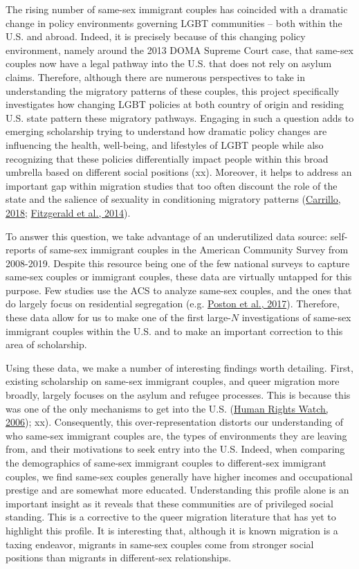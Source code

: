 \documentclass[
  11pt,
]{article}
\begin{document}
The rising number of same-sex immigrant couples has coincided with a dramatic change in policy environments governing LGBT communities -- both within the U.S. and abroad. Indeed, it is precisely because of this changing policy environment, namely around the 2013 DOMA Supreme Court case, that same-sex couples now have a legal pathway into the U.S. that does not rely on asylum claims. Therefore, although there are numerous perspectives to take in understanding the migratory patterns of these couples, this project specifically investigates how changing LGBT policies at both country of origin and residing U.S. state pattern these migratory pathways. Engaging in such a question adds to emerging scholarship trying to understand how dramatic policy changes are influencing the health, well-being, and lifestyles of LGBT people while also recognizing that these policies differentially impact people within this broad umbrella based on different social positions (xx). Moreover, it helps to address an important gap within migration studies that too often discount the role of the state and the salience of sexuality in conditioning migratory patterns (\protect\hyperlink{ref-carrillo_2018}{Carrillo, 2018}; \protect\hyperlink{ref-fitzgerald_2014}{Fitzgerald et al., 2014}).

To answer this question, we take advantage of an underutilized data source: self-reports of same-sex immigrant couples in the American Community Survey from 2008-2019. Despite this resource being one of the few national surveys to capture same-sex couples or immigrant couples, these data are virtually untapped for this purpose. Few studies use the ACS to analyze same-sex couples, and the ones that do largely focus on residential segregation (e.g. \protect\hyperlink{ref-poston_2017}{Poston et al., 2017}). Therefore, these data allow for us to make one of the first large-\(N\) investigations of same-sex immigrant couples within the U.S. and to make an important correction to this area of scholarship.

Using these data, we make a number of interesting findings worth detailing. First, existing scholarship on same-sex immigrant couples, and queer migration more broadly, largely focuses on the asylum and refugee processes. This is because this was one of the only mechanisms to get into the U.S. (\protect\hyperlink{ref-humanrightswatch_2006}{Human Rights Watch, 2006}); xx). Consequently, this over-representation distorts our understanding of who same-sex immigrant couples are, the types of environments they are leaving from, and their motivations to seek entry into the U.S. Indeed, when comparing the demographics of same-sex immigrant couples to different-sex immigrant couples, we find same-sex couples generally have higher incomes and occupational prestige and are somewhat more educated. Understanding this profile alone is an important insight as it reveals that these communities are of privileged social standing. This is a corrective to the queer migration literature that has yet to highlight this profile. It is interesting that, although it is known migration is a taxing endeavor, migrants in same-sex couples come from stronger social positions than migrants in different-sex relationships.
\end{document}
